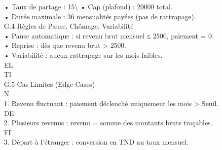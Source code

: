 \vspace{0.5em}
\vspace{0.5em}
• Taux de partage : 15\textbackslash{}%
\vspace{0.5em}
• Cap (plafond) : 20000 total.\\
\vspace{0.5em}
• Durée maximale : 36 mensualités payées (pas de rattrapage).\\
\vspace{0.5em}
\vspace{0.5em}
\vspace{0.5em}
G.4 Règles de Pause, Chômage, Variabilité\\
• Pause automatique : si revenu brut mensuel ≤ 2500, paiement = 0.\\
\vspace{0.5em}
• Reprise : dès que revenu brut \textgreater{} 2500.\\
\vspace{0.5em}
• Variabilité : aucun rattrapage sur les mois faibles.\\
\vspace{0.5em}
\vspace{0.5em}
\vspace{0.5em}
\vspace{0.5em}
EL\\
TI\\
G.5 Cas Limites (Edge Cases)\\
\vspace{0.5em}
\vspace{0.5em}
\vspace{0.5em}
\vspace{0.5em}
N\\
1. Revenu fluctuant : paiement déclenché uniquement les mois \textgreater{} Seuil.\\
\vspace{0.5em}
\vspace{0.5em}
\vspace{0.5em}
\vspace{0.5em}
DE\\
2. Plusieurs revenus : revenu = somme des montants bruts traçables.\\
\vspace{0.5em}
\vspace{0.5em}
\vspace{0.5em}
\vspace{0.5em}
FI\\
3. Départ à l’étranger : conversion en TND au taux mensuel.\\
